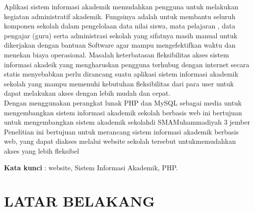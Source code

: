\documentclass{jtetiproposalskripsi}
\begin{document}
\cover

\approvalpage


\begin{abstractind}
Aplikasi sistem informasi akademik memudahkan pengguna untuk melakukan kegiatan administratif akademik. Fungsinya adalah untuk membantu seluruh komponen sekolah dalam pengelolaan data nilai siswa, mata pelajaran , data pengajar (guru) serta administrasi sekolah yang sifatnya masih manual untuk dikerjakan dengan bantuan Software agar mampu mengefektifkan waktu dan menekan biaya operasional. Masalah keterbatasan fleksibilitas akses sistem informasi akadeik yang mengharuskan pengguna terhubug dengan internet secara statis menyebabkan perlu  dirancang suatu aplikasi sistem informasi akademik sekolah yang mampu memenuhi kebutuhan fleksibilitas dari para user untuk dapat melakukan akses dengan lebih mudah dan cepat.\\

Dengan menggunakan perangkat lunak PHP dan MySQL  sebagai media untuk mengembangkan sistem informasi akademik sekolah berbasis web ini bertujuan untuk mengembangkan sistem akademik sekolahdi SMAMuhammadiyah 3 jember \\

Penelitian ini bertujuan untuk  merancang sistem informasi akademik  berbasis web, yang dapat diakses melalui website sekolah tersebut untukmemudahkan akses yang lebih fleksibel



\bigskip
\textbf{Kata kunci} : website, Sistem Informasi Akademik, PHP.
\end{abstractind}

\tableofcontents
{}
\clearpage{}\setcounter{page}{1}

\chapter{LATAR BELAKANG}
\end{document}
